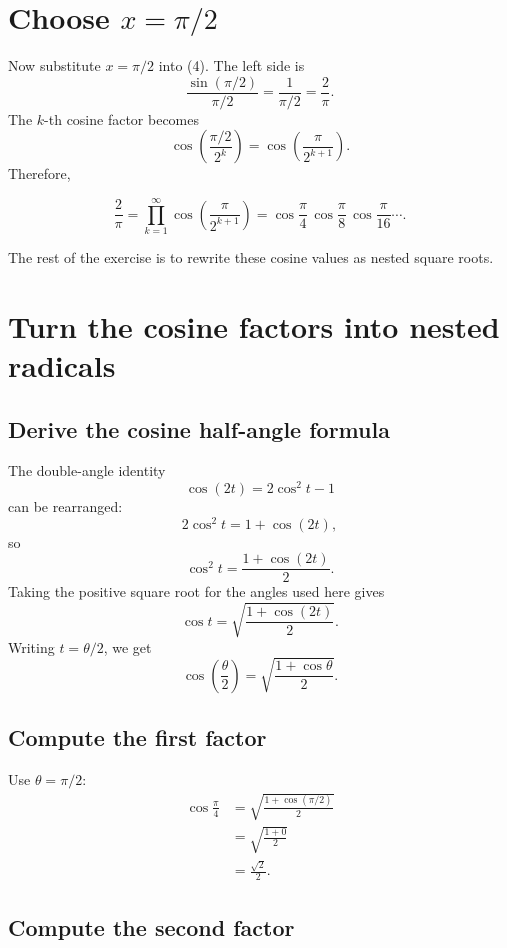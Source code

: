 \documentclass[11pt]{article}
\begin{document}
\section{Choose \texorpdfstring{\(x=\pi/2\)}{x = pi/2}}

Now substitute \(x=\pi/2\) into (4). The left side is
\[
  \frac{\sin(\pi/2)}{\pi/2}
  =\frac{1}{\pi/2}
  =\frac{2}{\pi}.
\]
The \(k\)-th cosine factor becomes
\[
  \cos\!\left(\frac{\pi/2}{2^k}\right)
  =\cos\!\left(\frac{\pi}{2^{k+1}}\right).
\]
Therefore,
\begin{solutionBox}
\[
\boxed{\displaystyle
  \frac{2}{\pi}
  =\prod_{k=1}^{\infty}
   \cos\!\left(\frac{\pi}{2^{k+1}}\right)}
  =\cos\frac{\pi}{4}\,
   \cos\frac{\pi}{8}\,
   \cos\frac{\pi}{16}\cdots .
\tag{5}
\]
\end{solutionBox}

The rest of the exercise is to rewrite these cosine values as nested square roots.

\section{Turn the cosine factors into nested radicals}

\subsection{Derive the cosine half-angle formula}

The double-angle identity
\[
  \cos(2t)=2\cos^2t-1
\]
can be rearranged:
\[
  2\cos^2t=1+\cos(2t),
\]
so
\[
  \cos^2t=\frac{1+\cos(2t)}{2}.
\]
Taking the positive square root for the angles used here gives
\[
  \cos t=\sqrt{\frac{1+\cos(2t)}{2}}.
\]
Writing \(t=\theta/2\), we get
\[
  \boxed{\displaystyle
  \cos\!\left(\frac{\theta}{2}\right)
  =\sqrt{\frac{1+\cos\theta}{2}}.}
\tag{6}
\]

\subsection{Compute the first factor}

Use \(\theta=\pi/2\):
\begin{align*}
  \cos\frac{\pi}{4}
  &=\sqrt{\frac{1+\cos(\pi/2)}{2}}\\
  &=\sqrt{\frac{1+0}{2}}\\
  &=\frac{\sqrt2}{2}.
\end{align*}

\subsection{Compute the second factor}
\end{document}
